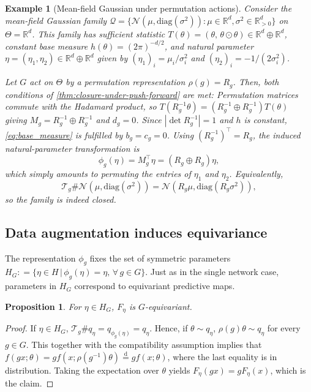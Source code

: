 \documentclass{article}
\newtheorem{proposition}{Proposition}
\newtheorem{example}{Example}
\begin{document}
\begin{example}[Mean-field Gaussian under permutation actions]
    Consider the mean-field Gaussian family $\mathcal{Q} = \{\mathcal{N}(\mu, \mathrm{diag}(\sigma^{2})): \mu \in \mathbb{R}^{d}, \sigma^{2} \in \mathbb{R}^{d}_{>0}\}$ on $\Theta = \mathbb{R}^{d}$. This family has sufficient statistic $T(\theta) = (\theta,\,\theta \odot \theta) \in \mathbb{R}^{d}\oplus \mathbb{R}^d$, constant base measure $h(\theta) = (2 \pi)^{-d/2}$, and natural parameter $\eta = (\eta_{1}, \eta_{2})\in\mathbb{R}^{d}\oplus \mathbb{R}^d$ given by $(\eta_{1})_{i} = \mu_{i} / \sigma_{i}^{2}$ and $(\eta_{2})_{i} = -1/(2 \sigma_{i}^{2})$. 
    
    Let $G$ act on $\Theta$ by a permutation representation $\rho(g) = R_{g}$. Then, both conditions of \cref{thm:closure-under-push-forward} are met: Permutation matrices commute with the Hadamard product, so $T(R_{g}^{-1} \theta) = (R_{g}^{-1} \oplus R_{g}^{-1})T(\theta)$
    giving $M_{g} = R_{g}^{-1} \oplus R_{g}^{-1}$ and $d_{g} = 0$. Since $|\det R_{g}^{-1}| = 1$ and $h$ is constant, \eqref{eq:base_measure} is fulfilled by $b_{g} = c_{g} = 0$. Using $(R_{g}^{-1})^{\top} = R_{g}$, the induced natural-parameter transformation is
    \begin{equation}
        \phi_{g}(\eta) = M_{g}^{\top} \eta = (R_{g} \oplus R_{g}) \eta,
    \end{equation}
    which simply amounts to permuting the entries of $\eta_{1}$ and $\eta_{2}$. Equivalently,
    \begin{equation}
        \mathcal{T}_{g} \# \mathcal{N}(\mu, \mathrm{diag}(\sigma^{2})) = \mathcal{N}(R_{g} \mu, \mathrm{diag}(R_{g} \sigma^{2})),
    \end{equation}
    so the family is indeed closed.
\end{example}

\subsection{Data augmentation induces equivariance}
\label{sec:data-augmentation-induces-equivariance}

The representation $\phi_g$ fixes the set of  symmetric parameters
$H_G : = \{\eta \in H \, \vert \, \phi_g(\eta)=\eta, \, \forall \, g\in G\}$.
Just as in the single network case, parameters in $H_G$ correspond to equivariant predictive maps.


\begin{proposition}
    For $\eta\in H_G$, $F_\eta$ is $G$-equivariant.
\end{proposition}
\begin{proof}
    If $\eta\in H_G$, $\mathcal{T}_{g} \# q_{\eta} =q_{\phi_{g}(\eta)}=q_{\eta}$. Hence, if $\theta \sim q_\eta$, $\rho(g)\theta\sim q_{\eta}$ for every $g\in G$. This together with the compatibility assumption implies that $f(gx;\theta) =gf(x;\rho(g^{-1})\theta)\stackrel{\mathrm{d}}{=} gf(x;\theta)$, where the last equality is in distribution. Taking the expectation over $\theta$ yields $F_\eta(gx)=gF_\eta(x)$, which is the claim. 
\end{proof}
\end{document}
